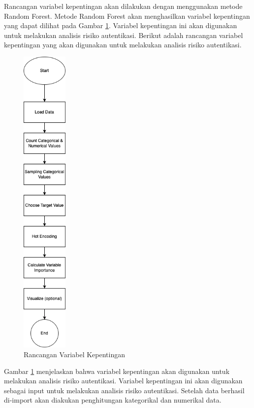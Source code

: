Rancangan variabel kepentingan akan dilakukan dengan menggunakan metode Random Forest. Metode Random Forest akan menghasilkan variabel kepentingan yang dapat dilihat pada Gambar \ref{fig:variabel-kepentingan}. Variabel kepentingan ini akan digunakan untuk melakukan analisis risiko autentikasi.
Berikut adalah rancangan variabel kepentingan yang akan digunakan untuk melakukan analisis risiko autentikasi.
\begin{figure}[H]
    \centering
    \includegraphics[width=0.2\textwidth]{BAB_TESIS/IMAGES/vim.drawio.png}
    \caption{Rancangan Variabel Kepentingan}
    \label{fig:variabel-kepentingan}
\end{figure}

Gambar \ref{fig:variabel-kepentingan} menjelaskan bahwa variabel kepentingan akan digunakan untuk melakukan analisis risiko autentikasi. Variabel kepentingan ini akan digunakan sebagai input untuk melakukan analisis risiko autentikasi.
Setelah data berhasil di-import akan diakukan penghitungan kategorikal dan numerikal data. 